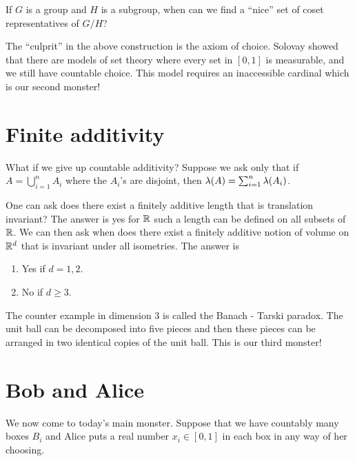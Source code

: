 \begin{question}
    If $G$ is a group and $H$ is a subgroup, when can we find a ``nice'' set of coset representatives of $G/H$? 
\end{question}    
The ``culprit'' in the above construction is the axiom of choice. Solovay showed that there are models of set theory where every set in $[0,1]$ is measurable, and we still have countable choice. This model requires an inaccessible cardinal which is our second monster!
\section{Finite additivity}
What if we give up countable additivity? Suppose we ask only that if $A = \bigcup_{i=1}^n A_i$ where the $A_i$'s are disjoint, then $\lambda(A) = \sum_{i=1}^n \lambda(A_i)$. 

One can ask does there exist a finitely additive length that is translation invariant? The answer is yes for ${\mathbb R}$ such a length can be defined on all subsets of ${\mathbb R}$. We can then ask when does there exist a finitely additive notion of volume on ${\mathbb R}^d$ that is invariant under all isometries. The answer is
\begin{enumerate}
    \item Yes if $d=1,2$.
    \item No if $d \ge 3$.
\end{enumerate}
The counter example in dimension 3 is called the Banach - Tarski paradox. The unit ball can be decomposed into five pieces and then these pieces can be arranged in two identical copies of the unit ball. This is our third monster!
\section{Bob and Alice}
We now come to today's main monster. Suppose that we have countably many boxes $B_i$ and Alice puts a real number $x_i \in [0,1]$ in each box in any way of her choosing.

